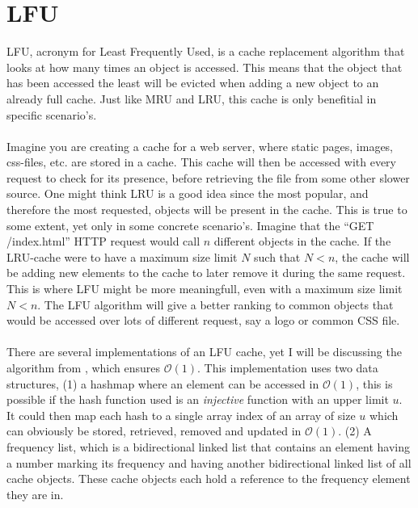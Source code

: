\documentclass[pdftex,a4paper,12pt,twoside]{report}
\begin{document}
\section{LFU}
LFU, acronym for Least Frequently Used, is a cache replacement algorithm that looks at how many times an object is accessed. This means that the object that has been accessed the least will be evicted when adding a new object to an already full cache. Just like MRU and LRU, this cache is only benefitial in specific scenario's.
\\\\
Imagine you are creating a cache for a web server, where static pages, images, css-files, etc. are stored in a cache. This cache will then be accessed with every request to check for its presence, before retrieving the file from some other slower source. One might think LRU is a good idea since the most popular, and therefore the most requested, objects will be present in the cache. This is true to some extent, yet only in some concrete scenario's. Imagine that the ``GET /index.html'' HTTP request would call $n$ different objects in the cache. If the LRU-cache were to have a maximum size limit $N$ such that $N < n$, the cache will be adding new elements to the cache to later remove it during the same request. This is where LFU might be more meaningfull, even with a maximum size limit $N < n$. The LFU algorithm will give a better ranking to common objects that would be accessed over lots of different request, say a logo or common CSS file.
\\\\
There are several implementations of an LFU cache, yet I will be discussing the algorithm from \cite{shah20101}, which ensures $\mathcal{O}(1)$.
This implementation uses two data structures, (1) a hashmap where an element can be accessed in $\mathcal{O}(1)$, this is possible if the hash function used is an 
\emph{injective} function with an upper limit $u$. It could then map each hash to a single array index of an array of size $u$ which can obviously be stored, retrieved, removed and updated in $\mathcal{O}(1)$. (2) A frequency list, which is a bidirectional linked list that contains an element having a number marking its frequency and having another bidirectional linked list of all cache objects. These cache objects each hold a reference to the frequency element they are in.
\end{document}
